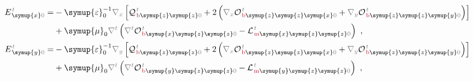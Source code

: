 \begin{subequations} \label{eq:E_0'}
\begin{align}
	E^{\;\!\mathcolor{gray}{t}}_{\;\! \symup{x}\mathcolor{gray}{0}} = &- {\symup{\varepsilon}}_0^{-1} \mathcolor{gray}{\nabla_x} \left[ {\mathcal{Q}}^{\;\!\mathcolor{gray}{t}}_{\;\!\textcolor{Maroon}{\text{b}}\symup{z} \symup{z} \mathcolor{gray}{0}} + 2 \left( \mathcolor{gray}{\nabla_x} {\mathcal{O}}^{\;\!\mathcolor{gray}{t}}_{\;\!\textcolor{Maroon}{\text{b}}\symup{z} \symup{z} \symup{x} \mathcolor{gray}{0}} + \mathcolor{gray}{\nabla_y}  {\mathcal{O}}^{\;\!\mathcolor{gray}{t}}_{\;\!\textcolor{Maroon}{\text{b}}\symup{z} \symup{z} \symup{y} \mathcolor{gray}{0}} \right) \right] \label{eq:E_x0'} \\ &+ {\symup{\mu}}_0 \mathcolor{gray}{\nabla^t} \left( \mathcolor{gray}{\nabla^t} {\mathcal{O}}^{\;\!\mathcolor{gray}{t}}_{\;\!\textcolor{Maroon}{\text{b}}\symup{x} \symup{z} \symup{z} \mathcolor{gray}{0}} - {\mathcal{L}}^{\;\!\mathcolor{gray}{t}}_{\;\!\textcolor{Maroon}{\text{m}}\symup{x} \symup{z} \symup{z} \mathcolor{gray}{0}} \right) ~, \\ E^{\;\!\mathcolor{gray}{t}}_{\;\! \symup{y}\mathcolor{gray}{0}} = &- {\symup{\varepsilon}}_0^{-1} \mathcolor{gray}{\nabla_y} \left[ {\mathcal{Q}}^{\;\!\mathcolor{gray}{t}}_{\;\!\textcolor{Maroon}{\text{b}}\symup{z} \symup{z} \mathcolor{gray}{0}} + 2 \left( \mathcolor{gray}{\nabla_x} {\mathcal{O}}^{\;\!\mathcolor{gray}{t}}_{\;\!\textcolor{Maroon}{\text{b}}\symup{z} \symup{z} \symup{x} \mathcolor{gray}{0}} + \mathcolor{gray}{\nabla_y}  {\mathcal{O}}^{\;\!\mathcolor{gray}{t}}_{\;\!\textcolor{Maroon}{\text{b}}\symup{z} \symup{z} \symup{y} \mathcolor{gray}{0}} \right) \right] \label{eq:E_y0'} \\ &+ {\symup{\mu}}_0 \mathcolor{gray}{\nabla^t} \left( \mathcolor{gray}{\nabla^t} {\mathcal{O}}^{\;\!\mathcolor{gray}{t}}_{\;\!\textcolor{Maroon}{\text{b}}\symup{y} \symup{z} \symup{z} \mathcolor{gray}{0}} - {\mathcal{L}}^{\;\!\mathcolor{gray}{t}}_{\;\!\textcolor{Maroon}{\text{m}}\symup{y} \symup{z} \symup{z} \mathcolor{gray}{0}} \right) ~, \\

\end{align}
\end{subequations}
